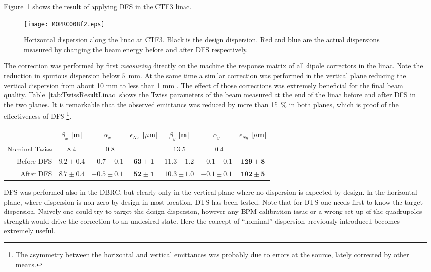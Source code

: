 Figure~\ref{fig:linacDFS} shows the result of applying DFS in the CTF3 linac. 
%
\begin{figure}[!htb]
   \centering
   \texttt{[image: MOPRC008f2.eps]}
   \caption{Horizontal dispersion along the linac at CTF3.
   Black is the design dispersion.
   Red and blue are the actual dispersions measured by changing the beam energy before and after DFS respectively.}
   \label{fig:linacDFS}
\end{figure}
%
The correction was performed by first \emph{measuring} directly on the machine the response matrix of 
all dipole correctors in the linac.
Note the reduction in spurious dispersion below 5~mm.
At the same time a similar correction was performed in the vertical plane reducing 
the vertical dispersion from about 10 mm to less than 1 mm \cite{bib:DavideThesis}.
The effect of those corrections was extremely beneficial for the final beam quality.
Table~\ref{tab:TwissResultLinac} shows the Twiss parameters of the beam measured at 
the end of the linac before and after DFS in the two planes.
It is remarkable that the observed emittance was reduced by more than 15~\% in both planes, 
which is proof of the effectiveness of DFS%
\footnote{The asymmetry between the horizontal and vertical emittances was probably due to errors at the source, lately corrected by other means.}. 
%
\begin{table*}[htbp]
\centering
\caption{
Transverse Twiss parameters of the beam measured at the end of the Drive Beam linac at CTF3 before and after DFS in the linac.
Also shown are the nominal Twiss parameters for the ideal machine.}
\begin{tabular}{r c c c c c c}
\hline
				& $\beta_x$  [m]	&  $\alpha_x$ 		&  $\epsilon_{Nx}$	 [$\mu$m]	 & $\beta_y$  [m]	&  $\alpha_y$ 		&  $\epsilon_{Ny}$	 [$\mu$m]	  \\
\hline
Nominal Twiss 	& $8.4$ 			& $-0.8$ 			& -- 						& $13.5$ 			& $-0.4$ 			& -- \\
Before DFS		& $9.2 \pm 0.4$ 	& $-0.7 \pm 0.1$ 	& $\mathbf{63 \pm 1}$ 				& $11.3 \pm 1.2$	& $-0.1 \pm 0.1$	&  $\mathbf{129 \pm 8}$ \\
After DFS			& $8.7 \pm 0.4$ 	& $-0.5 \pm 0.1$ 	& $\mathbf{52 \pm 1}$ 				& $10.3 \pm 1.0$	& $-0.1 \pm 0.1$	&  $\mathbf{102 \pm 5}$ \\
\hline
\end{tabular}
\label{tab:TwissResultLinac}
\end{table*}
%


DFS was performed also in the DBRC, but clearly only in the vertical plane where 
no dispersion is expected by design.
In the horizontal plane, where dispersion is non-zero by design in most location, 
DTS has been tested.
Note that for DTS one needs first to know the target dispersion.
Naively one could try to target the design dispersion, 
however any BPM calibration issue or a wrong set up of the quadrupoles strength would 
drive the correction to an undesired state.
Here the concept of ``nominal'' dispersion previously introduced becomes extremely useful.

